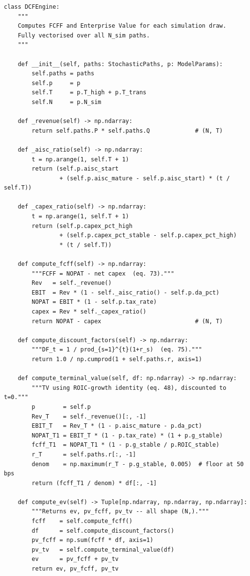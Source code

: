\begin{lstlisting}[style=python, caption={DCFEngine — vectorised FCFF computation and terminal value}]
class DCFEngine:
    """
    Computes FCFF and Enterprise Value for each simulation draw.
    Fully vectorised over all N_sim paths.
    """

    def __init__(self, paths: StochasticPaths, p: ModelParams):
        self.paths = paths
        self.p     = p
        self.T     = p.T_high + p.T_trans
        self.N     = p.N_sim

    def _revenue(self) -> np.ndarray:
        return self.paths.P * self.paths.Q             # (N, T)

    def _aisc_ratio(self) -> np.ndarray:
        t = np.arange(1, self.T + 1)
        return (self.p.aisc_start
                + (self.p.aisc_mature - self.p.aisc_start) * (t / self.T))

    def _capex_ratio(self) -> np.ndarray:
        t = np.arange(1, self.T + 1)
        return (self.p.capex_pct_high
                + (self.p.capex_pct_stable - self.p.capex_pct_high)
                * (t / self.T))

    def compute_fcff(self) -> np.ndarray:
        """FCFF = NOPAT - net capex  (eq. 73)."""
        Rev   = self._revenue()
        EBIT  = Rev * (1 - self._aisc_ratio() - self.p.da_pct)
        NOPAT = EBIT * (1 - self.p.tax_rate)
        capex = Rev * self._capex_ratio()
        return NOPAT - capex                           # (N, T)

    def compute_discount_factors(self) -> np.ndarray:
        """DF_t = 1 / prod_{s=1}^{t}(1+r_s)  (eq. 75)."""
        return 1.0 / np.cumprod(1 + self.paths.r, axis=1)

    def compute_terminal_value(self, df: np.ndarray) -> np.ndarray:
        """TV using ROIC-growth identity (eq. 48), discounted to t=0."""
        p        = self.p
        Rev_T    = self._revenue()[:, -1]
        EBIT_T   = Rev_T * (1 - p.aisc_mature - p.da_pct)
        NOPAT_T1 = EBIT_T * (1 - p.tax_rate) * (1 + p.g_stable)
        fcff_T1  = NOPAT_T1 * (1 - p.g_stable / p.ROIC_stable)
        r_T      = self.paths.r[:, -1]
        denom    = np.maximum(r_T - p.g_stable, 0.005)  # floor at 50 bps
        return (fcff_T1 / denom) * df[:, -1]

    def compute_ev(self) -> Tuple[np.ndarray, np.ndarray, np.ndarray]:
        """Returns ev, pv_fcff, pv_tv -- all shape (N,)."""
        fcff    = self.compute_fcff()
        df      = self.compute_discount_factors()
        pv_fcff = np.sum(fcff * df, axis=1)
        pv_tv   = self.compute_terminal_value(df)
        ev      = pv_fcff + pv_tv
        return ev, pv_fcff, pv_tv
\end{lstlisting}

